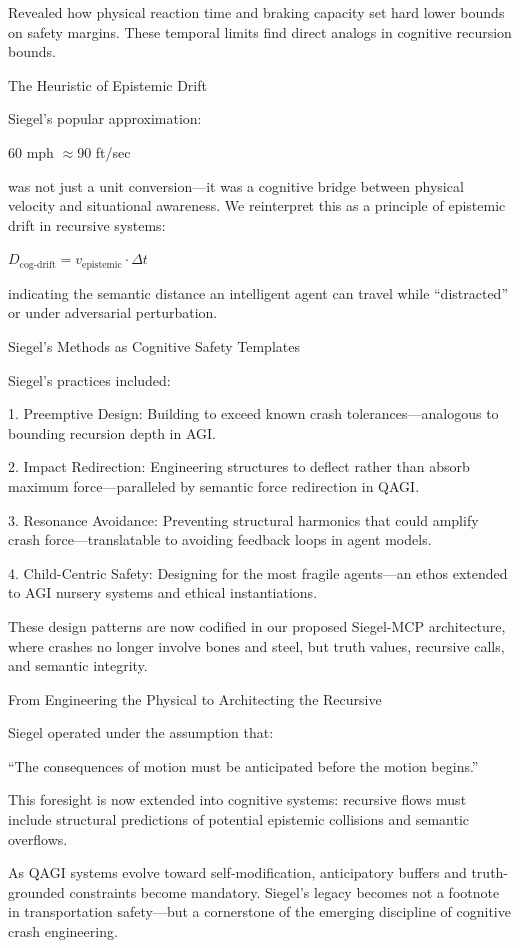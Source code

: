 \documentclass[11pt]{article}
\begin{document}
Revealed how physical reaction time and braking capacity set hard lower bounds on safety margins. These temporal limits find direct analogs in cognitive recursion bounds.

The Heuristic of Epistemic Drift

Siegel’s popular approximation:

60 mph $\approx$90 ft/sec

was not just a unit conversion—it was a cognitive bridge between physical velocity and situational awareness. We reinterpret this as a principle of epistemic drift in recursive systems:

$D_{\text{cog-drift}} = v_{\text{epistemic}} \cdot \Delta t$

indicating the semantic distance an intelligent agent can travel while “distracted” or under adversarial perturbation.

Siegel’s Methods as Cognitive Safety Templates

Siegel’s practices included:

1. Preemptive Design: Building to exceed known crash tolerances—analogous to bounding recursion depth in AGI.

2. Impact Redirection: Engineering structures to deflect rather than absorb maximum force—paralleled by semantic force redirection in QAGI.

3. Resonance Avoidance: Preventing structural harmonics that could amplify crash force—translatable to avoiding feedback loops in agent models.

4. Child-Centric Safety: Designing for the most fragile agents—an ethos extended to AGI nursery systems and ethical instantiations.

These design patterns are now codified in our proposed Siegel-MCP architecture, where crashes no longer involve bones and steel, but truth values, recursive calls, and semantic integrity.

From Engineering the Physical to Architecting the Recursive

Siegel operated under the assumption that:

“The consequences of motion must be anticipated before the motion begins.”

This foresight is now extended into cognitive systems: recursive flows must include structural predictions of potential epistemic collisions and semantic overflows.

As QAGI systems evolve toward self-modification, anticipatory buffers and truth-grounded constraints become mandatory. Siegel’s legacy becomes not a footnote in transportation safety—but a cornerstone of the emerging discipline of cognitive crash engineering.
\end{document}
